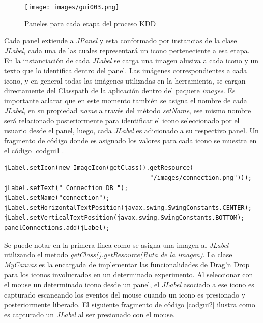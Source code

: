 \begin{figure}[!t]
\centering
\texttt{[image: images/gui003.png]}
\caption{Paneles para cada etapa del proceso KDD }
\label{gui003}
\end{figure}

Cada panel extiende a \textit{JPanel} y esta conformado por instancias de la clase \textit{JLabel}, cada una de
las cuales representar\'a un icono perteneciente a esa etapa.  En la instanciaci\'on de cada \textit{JLabel} se
carga una imagen alusiva a cada icono y un texto que lo identifica dentro del panel.  Las im\'agenes
correspondientes a cada icono, y en general todas las im\'agenes utilizadas en la herramienta, se cargan
directamente del Classpath de la aplicaci\'on dentro del paquete \textit{images}.  Es importante aclarar que en
este momento tambi\'en se asigna el nombre de cada \textit{JLabel}, en su propiedad \textit{name} a trav\'es del
m\'etodo \textit{setName}, ese mismo nombre ser\'a relacionado posteriormente para identificar el icono
seleccionado por el usuario desde el panel, luego, cada \textit{JLabel} es adicionado a su respectivo panel.  Un
fragmento de c\'odigo donde es asignado los valores para cada icono se muestra en el c\'odigo \ref{codgui1}.\\

\begin{codigof}[!h]
\begin{verbatim}
jLabel.setIcon(new ImageIcon(getClass().getResource(
                                        "/images/connection.png")));
jLabel.setText(" Connection DB ");
jLabel.setName("connection");
jLabel.setHorizontalTextPosition(javax.swing.SwingConstants.CENTER);
jLabel.setVerticalTextPosition(javax.swing.SwingConstants.BOTTOM);
panelConnections.add(jLabel);
\end{verbatim}
\caption{Asignaci\'on de valores a Iconos}
\label{codgui1}
\end{codigof}

Se puede notar en la primera l\'inea como se asigna una imagen al \textit{JLabel} utilizando el metodo
\textit{getClass().getResource(Ruta de la imagen)}.  La clase \textit{MyCanvas} es la encargada de implementar
las funcionalidades de Drag'n Drop para los iconos involucrados en un determinado experimento.   Al seleccionar
con el mouse un determinado icono desde un panel, el \textit{JLabel} asociado a ese icono es capturado escaneando
los eventos del mouse cuando un icono es presionado y posteriormente liberado.  El siguiente fragmento de
c\'odigo \ref{codgui2} ilustra como es capturado un \textit{JLabel} al ser presionado con el mouse.

